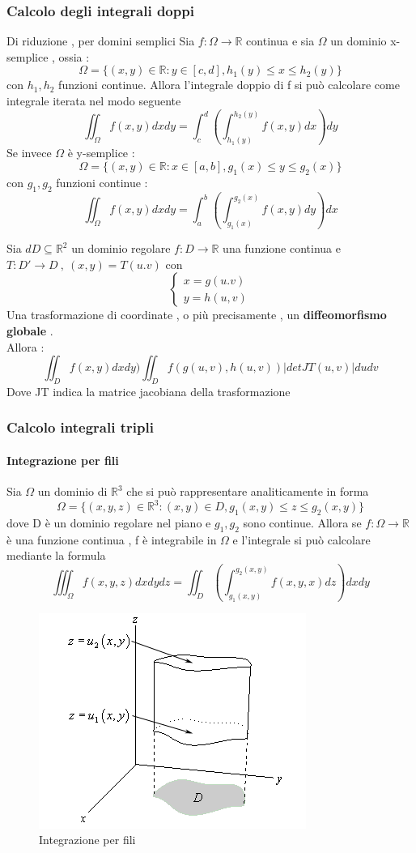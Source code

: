 \documentclass{article}
\theoremstyle{definition}
\newcommand{\R}{\mathbb{R}}
\begin{document}
	\subsubsection{Calcolo degli integrali doppi}
	\begin{teo}{Di riduzione , per domini semplici }{}
		Sia $f : \Omega \rightarrow \R$ continua e sia $\Omega$ un dominio x-semplice , ossia :
		$$\Omega=\{(x,y)\in \R : y \in [c,d],h_1(y)\leq x \leq h_2(y)\}$$
		con $h_1,h_2$ funzioni continue. Allora l'integrale doppio di f si può calcolare come integrale iterata nel modo seguente 
		$$\iint_{\Omega}f(x,y)dxdy=\int_c^d\left(\int_{h_1(y)}^{h_2(y)}f(x,y)dx\right)dy$$
		Se invece $\Omega$ è y-semplice :
		$$\Omega=\{(x,y)\in \R : x \in [a,b],g_1(x)\leq y \leq g_2(x)\}$$ 
		con $g_1,g_2$ funzioni continue  : 
		$$\iint_{\Omega}f(x,y)dxdy=\int_a^b\left(\int_{g_1(x)}^{g_2(x)}f(x,y)dy\right)dx$$
	\end{teo}
	\begin{teo}{}{}
		Sia $d D \subseteq\R^2$ un dominio regolare $f:D\rightarrow \R$ una funzione continua e $T:D'\rightarrow D \ , \ (x,y)=T(u.v) $  con $$\begin{cases}
			x=g(u.v)\\
			y=h(u,v)
		\end{cases}$$
		Una trasformazione di coordinate , o più precisamente , un \textbf{diffeomorfismo globale }.\\
		Allora :$$\iint_Df(x,y)dxdy)\iint_Df(g(u,v),h(u,v))|detJT(u,v)|dudv$$
		Dove JT indica la matrice jacobiana della trasformazione
	\end{teo}
	\subsubsection{Calcolo integrali tripli}
	\paragraph{Integrazione per fili}
	Sia $\Omega$ un dominio di $\R^3$ che si può rappresentare analiticamente in forma 
	$$\Omega=\{(x,y,z)\in \R^3: (x,y)\in D , g_1(x,y)\leq z \leq g_2(x,y)\}$$
	dove D è un dominio regolare nel piano e $g_1,g_2$ sono continue. Allora se $f:\Omega\rightarrow\R$ è una funzione continua , f è integrabile in $\Omega$ e l'integrale si può calcolare mediante la formula
	$$\iiint_\Omega f(x,y,z)dxdydz=\iint_{D}\left(\int_{g_1(x,y)}^{g_2(x,y)}f(x,y,x)dz\right)dxdy$$
	\begin{figure}[h]
		\centering
		\includegraphics[width=0.5\linewidth]{immagini/Screenshot 2024-11-21 at 16.49.13.png}
		\caption{Integrazione per fili}
		\label{fig:enter-label}
	\end{figure}
\end{document}
